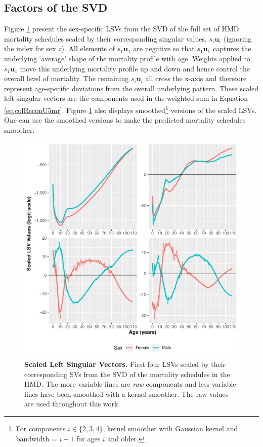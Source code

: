 \documentclass[11pt]{article}
\newcommand{\mbf}{\mathbf}
\DeclareRobustCommand{\LTtot}{}
\begin{document}
\subsection{Factors of the SVD} \label{sec:results:SVDFacs}

Figure \ref{fig:svd}  present the sex-specific LSVs from the SVD of the full set of HMD mortality schedules scaled by their corresponding singular values, $s_{i} \mathbf{u}_{i}$ (ignoring the index for sex $z$).  All elements of $s_1\mbf{u}_1$ are negative so that $s_1\mbf{u}_1$ captures the underlying `average' shape of the mortality profile with age.  Weights applied to $s_1\mbf{u}_1$ move this underlying mortality profile up and down and hence control the overall level of mortality.  The remaining $s_i\mbf{u}_i$ all cross the x-axis and therefore represent age-specific deviations from the overall underlying pattern.  These scaled left singular vectors are the components used in the weighted sum in Equation \ref{eq:colReconU5mr}.  Figure \ref{fig:svd} also displays smoothed\footnote{For components $i \in \{2,3,4\}$, kernel smoother with Gaussian kernel and bandwidth = $i+1$ for ages $i$ and older.} versions of the scaled LSVs.  One can use the smoothed versions to make the predicted mortality schedules smoother.

\begin{figure}[htbp]
   \centering
   \includegraphics[width=\linewidth]{../figures/fig2.pdf} 
   \captionsetup{format=plain,font=normalsize,margin=0cm,justification=justified}
   \caption{\textbf{Scaled Left Singular Vectors.} First four LSVs scaled by their corresponding SVs from the SVD of the \LTtot mortality schedules in the HMD.  The more variable lines are \textit{raw} components and less variable lines have been smoothed with a kernel smoother.  The raw values are used throughout this work.}
   \label{fig:svd}
\end{figure}
\end{document}
